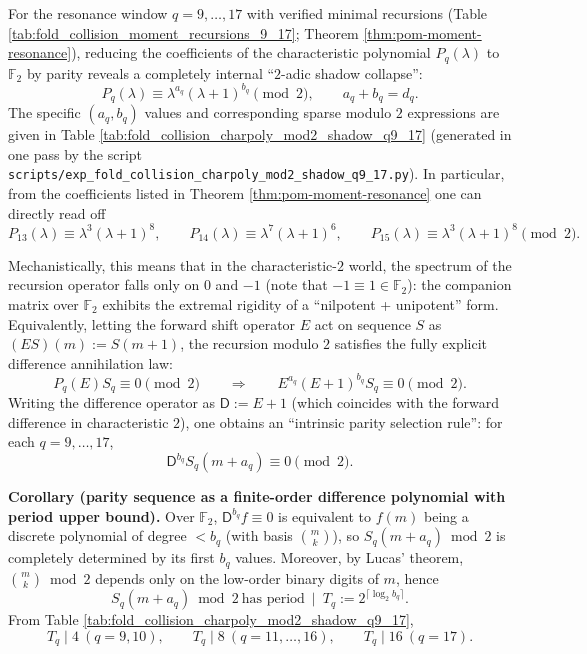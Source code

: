 \begin{remark}\label{rem:pom-charpoly-mod2-shadow}
For the resonance window \(q=9,\dots,17\) with verified minimal recursions (Table \ref{tab:fold_collision_moment_recursions_9_17}; Theorem \ref{thm:pom-moment-resonance}), reducing the coefficients of the characteristic polynomial \(P_q(\lambda)\) to \(\mathbb{F}_2\) by parity reveals a completely internal ``\(2\)-adic shadow collapse'':
\[
P_q(\lambda)\equiv \lambda^{a_q}(\lambda+1)^{b_q}\pmod 2,
\qquad a_q+b_q=d_q.
\]
The specific \((a_q,b_q)\) values and corresponding sparse modulo \(2\) expressions are given in Table \ref{tab:fold_collision_charpoly_mod2_shadow_q9_17} (generated in one pass by the script \texttt{scripts/exp\_fold\_collision\_charpoly\_mod2\_shadow\_q9\_17.py}).
In particular, from the coefficients listed in Theorem \ref{thm:pom-moment-resonance} one can directly read off
\[
P_{13}(\lambda)\equiv \lambda^3(\lambda+1)^8,\qquad
P_{14}(\lambda)\equiv \lambda^7(\lambda+1)^6,\qquad
P_{15}(\lambda)\equiv \lambda^3(\lambda+1)^8\pmod 2.
\]
\par
Mechanistically, this means that in the characteristic-\(2\) world, the spectrum of the recursion operator falls only on \(0\) and \(-1\) (note that \(-1\equiv 1\in\mathbb{F}_2\)): the companion matrix over \(\mathbb{F}_2\) exhibits the extremal rigidity of a ``nilpotent + unipotent'' form.
Equivalently, letting the forward shift operator \(E\) act on sequence \(S\) as \((ES)(m):=S(m+1)\), the recursion modulo \(2\) satisfies the fully explicit difference annihilation law:
\[
P_q(E)S_q\equiv 0\pmod 2
\qquad\Longrightarrow\qquad
E^{a_q}(E+1)^{b_q}S_q\equiv 0\pmod 2.
\]
Writing the difference operator as \(\mathsf{D}:=E+1\) (which coincides with the forward difference in characteristic \(2\)), one obtains an ``intrinsic parity selection rule'': for each \(q=9,\dots,17\),
\[
\mathsf{D}^{b_q}S_q(m+a_q)\equiv 0\pmod 2.
\]
\par
\textbf{Corollary (parity sequence as a finite-order difference polynomial with period upper bound).}
Over \(\mathbb{F}_2\), \(\mathsf{D}^{b_q}f\equiv 0\) is equivalent to \(f(m)\) being a discrete polynomial of degree \(<b_q\) (with basis \(\binom{m}{k}\)), so \(S_q(m+a_q)\bmod 2\) is completely determined by its first \(b_q\) values.
Moreover, by Lucas' theorem, \(\binom{m}{k}\bmod 2\) depends only on the low-order binary digits of \(m\), hence
\[
S_q(m+a_q)\bmod 2\ \text{has period}\ \mid\ T_q:=2^{\lceil\log_2 b_q\rceil}.
\]
From Table \ref{tab:fold_collision_charpoly_mod2_shadow_q9_17},
\[
T_q\mid 4\ (q=9,10),\qquad
T_q\mid 8\ (q=11,\dots,16),\qquad
T_q\mid 16\ (q=17).
\]
\end{remark}

